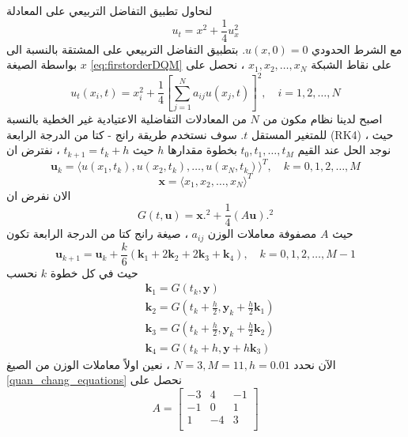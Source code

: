 \begin{example}
	لنحاول تطبيق التفاضل التربيعي على المعادلة 
	\begin{equation}
		\label{eq:firstex}
		u_t = x^2 + \frac{1}{4} u_x^2
	\end{equation}
	مع الشرط الحدودي $u(x,0) = 0$. بتطبيق التفاضل التربيعي على المشتقة بالنسبة الى $x$ بواسطة الصيغة \eqref{eq:firstorderDQM} على نقاط الشبكة $x_1, x_2, \dots, x_N$ ، نحصل على
	\begin{equation}
		\label{eq:firstexapplied}
		u_t (x_i, t) = x_i^2 + \frac{1}{4} \left[\sum_{j=1}^{N} a_{ij} u(x_j, t)\right]^2 , \quad i=1,2,\dots,N
 	\end{equation}
 	اصبح لدينا نظام مكون من $N$ من المعادلات التفاضلية الاعتيادية غير الخطية بالنسبة للمتغير المستقل $t$. سوف نستخدم طريقة رانج - كتا من الدرجة الرابعة (RK4) ، حيث نوجد الحل عند القيم $t_0, t_1, \dots, t_M$ بخطوة مقدارها $h$ حيث $t_{k+1} = t_k + h$ ، نفترض ان 
 	\[
 	\mathbf{u}_k = \langle u(x_1, t_k) , u(x_2,t_k), \dots, u(x_N, t_k)\rangle^T, \quad k=0,1,2,\dots,M
 	\]
 	\[
 	\mathbf{x} = \langle x_1, x_2, \dots, x_N\rangle^T
 	\]
 	الان نفرض ان
 	\[
 	G(t, \mathbf{u}) = \mathbf{x}.^2 + \frac{1}{4} (A \mathbf{u}).^2
 	\]
 	حيث $A$ مصفوفة معاملات الوزن $a_{ij}$ ، صيغة رانج كتا من الدرجة الرابعة تكون
 	\begin{equation}
 		\label{eq:firstexRK4}
 		\mathbf{u}_{k+1} = \mathbf{u}_k + \frac{k}{6} (\mathbf{k}_1+2\mathbf{k}_2+2\mathbf{k}_3+\mathbf{k}_4), \quad k=0,1,2,\dots,M-1
 	\end{equation}
 	حيث في كل خطوة $k$ نحسب
 	\[
 	\begin{aligned}
 		&\mathbf{k}_1 = G(t_k, \mathbf{y})\\
 		&\mathbf{k}_2 = G\left(t_k + \frac{h}{2}, \mathbf{y}_k + \frac{h}{2}\mathbf{k}_1  \right)\\
 		&\mathbf{k}_3 = G\left(t_k + \frac{h}{2}, \mathbf{y}_k + \frac{h}{2}\mathbf{k}_2  \right)\\
 		&\mathbf{k}_4 = G(t_k + h, \mathbf{y} + h\mathbf{k}_3)
 	\end{aligned}
 	\]
 	الآن نحدد $N=3, M=11, h=0.01 $ ، نعين اولاً معاملات الوزن من الصيغ \eqref{quan_chang_equations} نحصل على 
 	\[
 	A = 
\begin{bmatrix}
	-3 & 4 & -1 \\
	-1 & 0 & 1 \\
	1 & -4 & 3 \\
\end{bmatrix}
 	\]
 	

\end{example}
